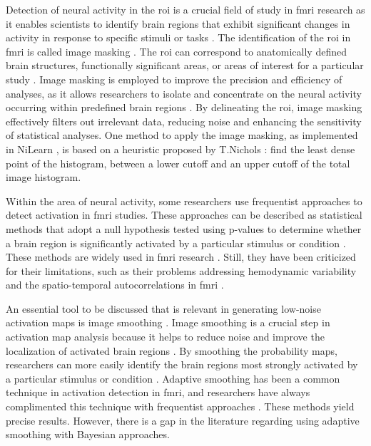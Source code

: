 Detection of neural activity in the \gls{roi} is a crucial field of study in \gls{fmri} research as it enables scientists to identify brain regions that exhibit significant changes in activity in response to specific stimuli or tasks \cite{ardekani1999activation}. The identification of the \gls{roi} in \gls{fmri} is called image masking \cite{peer2016intensity}. The \gls{roi} can correspond to anatomically defined brain structures, functionally significant areas, or areas of interest for a particular study \cite{poldrack2007region}. Image masking is employed to improve the precision and efficiency of analyses, as it allows researchers to isolate and concentrate on the neural activity occurring within predefined brain regions \cite{mitsis2008regions}. By delineating the \gls{roi}, image masking effectively filters out irrelevant data, reducing noise and enhancing the sensitivity of statistical analyses. One method to apply the image masking, as implemented in NiLearn \cite{abraham2014machine}, is based on a heuristic proposed by T.Nichols \cite{luo2003diagnosis}: find the least dense point of the histogram, between a lower cutoff and an upper cutoff of the total image histogram.

Within the area of neural activity, some researchers use frequentist approaches to detect activation in \gls{fmri} studies. These approaches can be described as statistical methods that adopt a null hypothesis tested using p-values to determine whether a brain region is significantly activated by a particular stimulus or condition \cite{friston2002classical, almodovar2019fast}. These methods are widely used in \gls{fmri} research \cite{almodovar2019fast, josephs1997event, worsley1995analysis, worsley1996searching}. Still, they have been criticized for their limitations, such as their problems addressing hemodynamic variability and the spatio-temporal autocorrelations in \gls{fmri} \cite{woolrich2012years}.

An essential tool to be discussed that is relevant in generating low-noise activation maps is image smoothing \cite{lee1983digital}. Image smoothing is a crucial step in activation map analysis because it helps to reduce noise and improve the localization of activated brain regions \cite{lindquist2010adaptive, strappini2017adaptive, garg2016quality}. By smoothing the probability maps, researchers can more easily identify the brain regions most strongly activated by a particular stimulus or condition \cite{tabelow2006analyzing}. Adaptive smoothing has been a common technique in activation detection in \gls{fmri}, and researchers have always complimented this technique with frequentist approaches \cite{triantafyllou2006effect, mikl2008effects, liu2017functional}. These methods yield precise results. However, there is a gap in the literature regarding using adaptive smoothing with Bayesian approaches.

